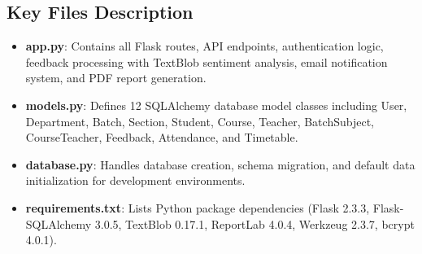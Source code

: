\subsection*{Key Files Description}

\begin{itemize}
    \item \textbf{app.py}: Contains all Flask routes, API endpoints, authentication logic, feedback processing with TextBlob sentiment analysis, email notification system, and PDF report generation.
    \item \textbf{models.py}: Defines 12 SQLAlchemy database model classes including User, Department, Batch, Section, Student, Course, Teacher, BatchSubject, CourseTeacher, Feedback, Attendance, and Timetable.
    \item \textbf{database.py}: Handles database creation, schema migration, and default data initialization for development environments.
    \item \textbf{requirements.txt}: Lists Python package dependencies (Flask 2.3.3, Flask-SQLAlchemy 3.0.5, TextBlob 0.17.1, ReportLab 4.0.4, Werkzeug 2.3.7, bcrypt 4.0.1).
\end{itemize}
